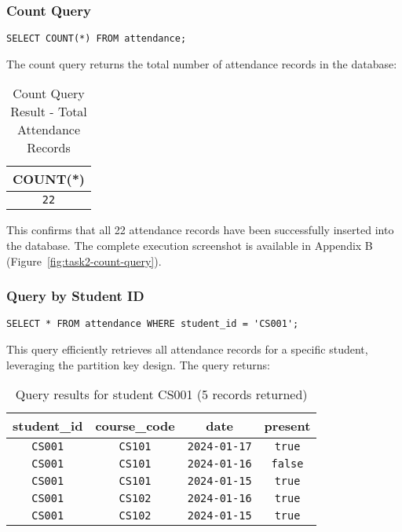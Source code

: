 \subsubsection{Count Query}
\begin{verbatim}
SELECT COUNT(*) FROM attendance;
\end{verbatim}

The count query returns the total number of attendance records in the database:

\begin{table}[H]
\centering
\begin{tabular}{|c|}
\hline
\textbf{COUNT(*)} \\
\hline
\texttt{22} \\
\hline
\end{tabular}
\caption{Count Query Result - Total Attendance Records}
\end{table}

This confirms that all 22 attendance records have been successfully inserted into the database. The complete execution screenshot is available in Appendix B (Figure~\ref{fig:task2-count-query}).

\subsubsection{Query by Student ID}
\begin{verbatim}
SELECT * FROM attendance WHERE student_id = 'CS001';
\end{verbatim}

This query efficiently retrieves all attendance records for a specific student, leveraging the partition key design. The query returns:

\begin{table}[H]
  \centering
  \footnotesize
  \begin{tabular}{|c|c|c|c|}
    \hline
    \textbf{student\_id} & \textbf{course\_code} & \textbf{date} & \textbf{present} \\
    \hline
    \texttt{CS001}                & \texttt{CS101}                 & \texttt{2024-01-17}    & \texttt{true}             \\
    \texttt{CS001}                & \texttt{CS101}                 & \texttt{2024-01-16}    & \texttt{false}            \\
    \texttt{CS001}                & \texttt{CS101}                 & \texttt{2024-01-15}    & \texttt{true}             \\
    \texttt{CS001}                & \texttt{CS102}                 & \texttt{2024-01-16}    & \texttt{true}             \\
    \texttt{CS001}                & \texttt{CS102}                 & \texttt{2024-01-15}    & \texttt{true}             \\
    \hline
  \end{tabular}
  \caption{Query results for student CS001 (5 records returned)}
\end{table}

